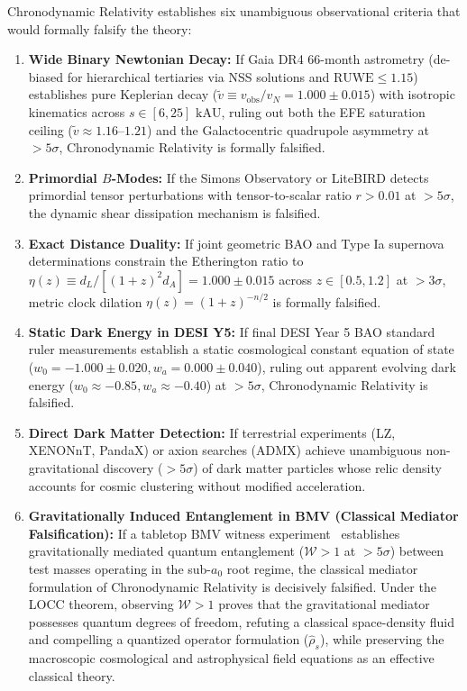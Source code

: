 \documentclass[aps,prd,reprint,superscriptaddress,nofootinbib,twocolumn,floatfix]{revtex4-2}
\begin{document}
Chronodynamic Relativity establishes six unambiguous observational criteria that would formally falsify the theory:
\begin{enumerate}\setlength{\itemsep}{1pt}\setlength{\parskip}{0pt}
    \item \textbf{Wide Binary Newtonian Decay:} If Gaia DR4 66-month astrometry (de-biased for hierarchical tertiaries via NSS solutions and $\text{RUWE} \le 1.15$) establishes pure Keplerian decay ($\tilde{v} \equiv v_{\text{obs}}/v_N = 1.000 \pm 0.015$) with isotropic kinematics across $s \in [6, 25]\text{ kAU}$, ruling out both the EFE saturation ceiling ($\tilde{v} \approx 1.16\text{--}1.21$) and the Galactocentric quadrupole asymmetry at $>5\sigma$, Chronodynamic Relativity is formally falsified.
    \item \textbf{Primordial $B$-Modes:} If the Simons Observatory or LiteBIRD detects primordial tensor perturbations with tensor-to-scalar ratio $r > 0.01$ at $>5\sigma$, the dynamic shear dissipation mechanism is falsified.
    \item \textbf{Exact Distance Duality:} If joint geometric BAO and Type Ia supernova determinations constrain the Etherington ratio to $\eta(z) \equiv d_L / [(1+z)^2 d_A] = 1.000 \pm 0.015$ across $z \in [0.5, 1.2]$ at $>3\sigma$, metric clock dilation $\eta(z) = (1+z)^{-n/2}$ is formally falsified.
    \item \textbf{Static Dark Energy in DESI Y5:} If final DESI Year 5 BAO standard ruler measurements establish a static cosmological constant equation of state ($w_0 = -1.000 \pm 0.020, w_a = 0.000 \pm 0.040$), ruling out apparent evolving dark energy ($w_0 \approx -0.85, w_a \approx -0.40$) at $>5\sigma$, Chronodynamic Relativity is falsified.
    \item \textbf{Direct Dark Matter Detection:} If terrestrial experiments (LZ, XENONnT, PandaX) or axion searches (ADMX) achieve unambiguous non-gravitational discovery ($>5\sigma$) of dark matter particles whose relic density accounts for cosmic clustering without modified acceleration.
    \item \textbf{Gravitationally Induced Entanglement in BMV (Classical Mediator Falsification):} If a tabletop BMV witness experiment~\cite{bose2017spin,marletto2017gravitationally} establishes gravitationally mediated quantum entanglement ($\mathcal{W} > 1$ at $>5\sigma$) between test masses operating in the sub-$a_0$ root regime, the classical mediator formulation of Chronodynamic Relativity is decisively falsified. Under the LOCC theorem, observing $\mathcal{W} > 1$ proves that the gravitational mediator possesses quantum degrees of freedom, refuting a classical space-density fluid and compelling a quantized operator formulation ($\hat{\rho}_s$), while preserving the macroscopic cosmological and astrophysical field equations as an effective classical theory.
\end{enumerate}
\end{document}
